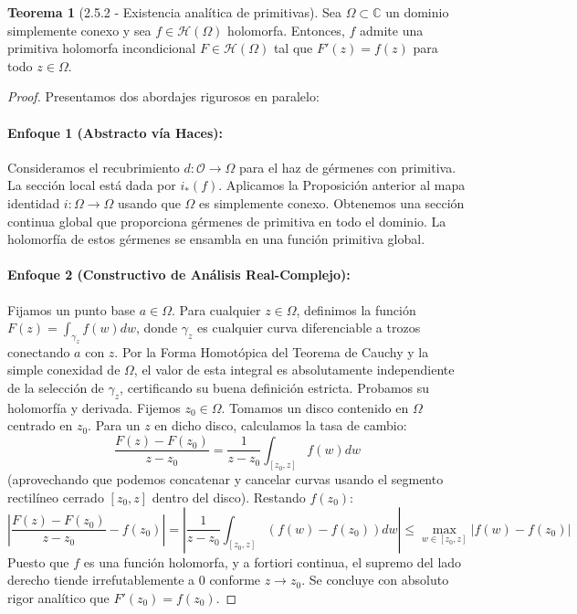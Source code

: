\documentclass[11pt,a4paper]{article}
\theoremstyle{definition}
\newtheorem{teorema}{Teorema}[section]
\theoremstyle{remark}
\numberwithin{equation}{section}
\begin{document}
\begin{teorema}[2.5.2 - Existencia analítica de primitivas]
Sea $\Omega \subset \mathbb{C}$ un dominio simplemente conexo y sea $f \in \mathcal{H}(\Omega)$ holomorfa. Entonces, $f$ admite una primitiva holomorfa incondicional $F \in \mathcal{H}(\Omega)$ tal que $F'(z) = f(z)$ para todo $z \in \Omega$.
\end{teorema}
\begin{proof}
Presentamos dos abordajes rigurosos en paralelo:
\paragraph{Enfoque 1 (Abstracto vía Haces):} Consideramos el recubrimiento $d : \mathcal{O} \to \Omega$ para el haz de gérmenes con primitiva. La sección local está dada por $i_*(f)$. Aplicamos la Proposición anterior al mapa identidad $i: \Omega \to \Omega$ usando que $\Omega$ es simplemente conexo. Obtenemos una sección continua global que proporciona gérmenes de primitiva en todo el dominio. La holomorfía de estos gérmenes se ensambla en una función primitiva global.

\paragraph{Enfoque 2 (Constructivo de Análisis Real-Complejo):} Fijamos un punto base $a \in \Omega$. Para cualquier $z \in \Omega$, definimos la función $F(z) = \int_{\gamma_z} f(w) dw$, donde $\gamma_z$ es cualquier curva diferenciable a trozos conectando $a$ con $z$. Por la Forma Homotópica del Teorema de Cauchy y la simple conexidad de $\Omega$, el valor de esta integral es absolutamente independiente de la selección de $\gamma_z$, certificando su buena definición estricta. 
Probamos su holomorfía y derivada. Fijemos $z_0 \in \Omega$. Tomamos un disco contenido en $\Omega$ centrado en $z_0$. Para un $z$ en dicho disco, calculamos la tasa de cambio:
$$ \frac{F(z) - F(z_0)}{z - z_0} = \frac{1}{z-z_0} \int_{[z_0, z]} f(w) dw $$
(aprovechando que podemos concatenar y cancelar curvas usando el segmento rectilíneo cerrado $[z_0, z]$ dentro del disco).
Restando $f(z_0)$:
$$ \left| \frac{F(z) - F(z_0)}{z - z_0} - f(z_0) \right| = \left| \frac{1}{z-z_0} \int_{[z_0, z]} (f(w) - f(z_0)) dw \right| \le \max_{w \in [z_0, z]} |f(w) - f(z_0)| $$
Puesto que $f$ es una función holomorfa, y a fortiori continua, el supremo del lado derecho tiende irrefutablemente a $0$ conforme $z \to z_0$. Se concluye con absoluto rigor analítico que $F'(z_0) = f(z_0)$.
\end{proof}
\end{document}
